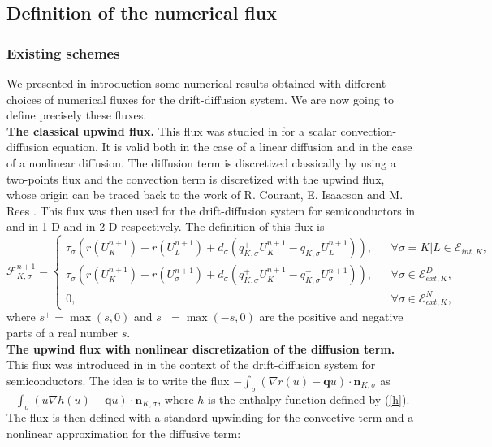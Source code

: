 \documentclass[smallextended]{svjour3}
\newcommand{\ds}{\displaystyle}
\begin{document}


\subsection{Definition of the numerical flux}


\subsubsection{Existing schemes}

We presented in introduction some numerical results obtained with different choices of numerical fluxes for the drift-diffusion system. We are now going to define precisely these fluxes.\\
\newline
\textbf{The classical upwind flux.} This flux was studied in \cite{Eymard2000} for a scalar convection-diffusion equation. It is valid both in the case of a linear diffusion and in the case of a nonlinear diffusion. The diffusion term is discretized classically by using a two-points flux and the convection term is discretized with the upwind flux, whose origin can be traced back to the work of R. Courant, E. Isaacson and M. Rees \cite{Courant1952}. This flux was then used for the drift-diffusion system for semiconductors in \cite{Chainais-Hillairet2003a} and \cite{Chainais-Hillairet2003,Chainais-Hillairet2004} in 1-D and in 2-D respectively. The definition of this flux is
\begin{equation}
\mathcal{F}_{K,\sigma}^{n+1}= \left\{\begin{array}{lll} \tau_{\sigma} \left(r\left(U_{K}^{n+1}\right)-r\left(U_{L}^{n+1}\right)+d_{\sigma}\left(q_{K,\sigma}^{+}U_{K}^{n+1}-q_{K,\sigma}^{-}U_{L}^{n+1}\right)\right), & &  \forall \sigma=K|L \in \mathcal{E}_{int,K},\\ \tau_{\sigma} \left(r\left(U_{K}^{n+1}\right)-r\left(U_{\sigma}^{n+1}\right)+d_{\sigma}\left(q_{K,\sigma}^{+}U_{K}^{n+1}-q_{K,\sigma}^{-}U_{\sigma}^{n+1}\right)\right),& &  \forall \sigma \in \mathcal{E}_{ext,K}^{D},\\ 0, & &  \forall \sigma \in \mathcal{E}_{ext,K}^{N}, \end{array}\right.
\label{upwindclass}
\end{equation}
where $s^{+}=\max(s,0)$ and $s^{-}=\max(-s,0)$ are the positive and negative parts of a real number $s$. \\
\textbf{The upwind flux with nonlinear discretization of the diffusion term.} This flux was introduced in \cite{Chainais-Hillairet2007} in the context of the drift-diffusion system for semiconductors. The idea is to write the flux $\ds{-\int_{\sigma} (\nabla r(u)-\textbf{q}u)\cdot \mathbf{n}_{K,\sigma}}$ as $\ds{-\int_{\sigma} (u \nabla h(u)-\textbf{q}u)\cdot \mathbf{n}_{K,\sigma}}$, where $h$ is the enthalpy function defined by (\ref{h}). The flux is then defined with a standard upwinding for the convective term and a nonlinear approximation for the diffusive term:
\end{document}
